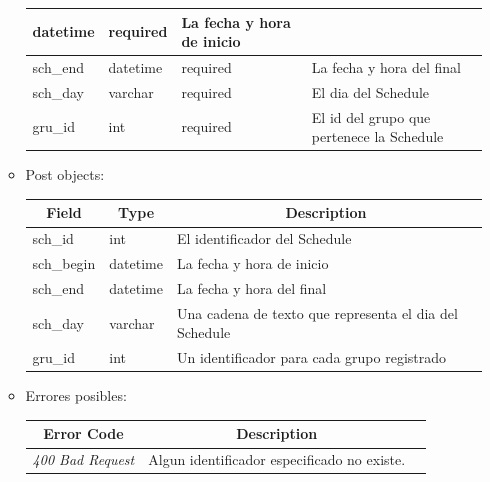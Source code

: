 \documentclass{article}
\begin{document}
\begin{enumerate}
\begin{itemize}
\begin{table}[H]
\begin{tabular}{|l|l|l|l|}
        datetime & required & La fecha y hora de inicio \\ \hline sch\_end &
        datetime & required & La fecha y hora del final \\ \hline sch\_day &
        varchar & required & El dia del Schedule \\ \hline gru\_id & int &
        required & El id del grupo que pertenece la Schedule \\ \hline
        \end{tabular} \end{table}
        \item Post objects:
        \begin{table}[H] \centering \begin{tabular}{|l|l|l|} \hline
        \multicolumn{1}{|c|}{\textbf{Field}} &
        \multicolumn{1}{c|}{\textbf{Type}} &
        \multicolumn{1}{c|}{\textbf{Description}} \\ \hline sch\_id & int & El
        identificador del Schedule \\ \hline sch\_begin & datetime & La fecha y
        hora de inicio \\ \hline sch\_end & datetime & La fecha y hora del final
        \\ \hline sch\_day & varchar & Una cadena de texto que representa el dia
        del Schedule \\ \hline gru\_id & int & Un identificador para cada grupo
        registrado \\ \hline \end{tabular} \end{table}

        \item Errores posibles: \begin{table}[H] \centering \begin{tabular}{|c|c|l|} \hline
        \textbf{Error Code} & \textbf{Description} \\ \hline \textit{400 Bad
        Request} & Algun identificador especificado no existe. \\ \hline
        \end{tabular} \end{table}
    \end{itemize}


\end{enumerate}
\end{document}

